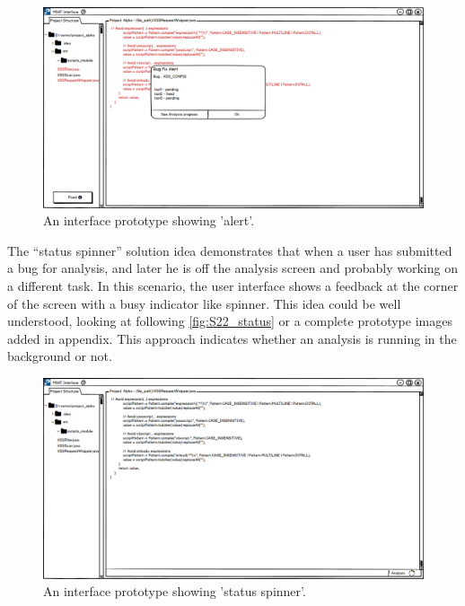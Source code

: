 \begin{figure}[hbt!]
	\centering
	\includegraphics[width=\linewidth]{figures/solution_ideas_snaps/S22_try_again_alert}
	\caption{An interface prototype showing 'alert'.}
	\label{fig:S22_try_again_alert}
\end{figure}

The “status spinner” solution idea demonstrates that when a user has submitted a bug for analysis, and later he is off the analysis screen and probably working on a different task. In this scenario, the user interface shows a feedback at the corner of the screen with a busy indicator like spinner. This idea could be well understood, looking at following \autoref{fig:S22_status} or a complete prototype images added in appendix. This approach indicates whether an analysis is running in the background or not. \\


\begin{figure}[hbt!]
	\centering
	\includegraphics[width=\linewidth]{figures/solution_ideas_snaps/S22_status}
	\caption{An interface prototype showing 'status spinner'.}
	\label{fig:S22_status}
\end{figure}

